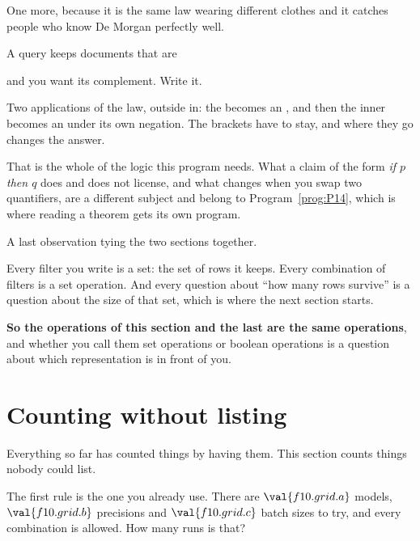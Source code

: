 \begin{fr}
One more, because it is the same law wearing different clothes and it catches
people who know De Morgan perfectly well.

A query keeps documents that are
\begin{center}\end{center}
and you want its complement. Write it.
\nextframe
\end{fr}

\begin{fr}
\begin{ansblock}
\end{ansblock}

Two applications of the law, outside in: the  becomes an ,
and then the inner  becomes an  under its own negation. The
brackets have to stay, and where they go changes the answer.

That is the whole of the logic this program needs. What a claim of the form
\emph{if $p$ then $q$} does and does not license, and what changes when you
swap two quantifiers, are a different subject and belong to
Program~\ref{prog:P14}, which is where reading a theorem gets its own program.
\end{fr}

\begin{fr}
A last observation tying the two sections together.

Every filter you write is a set: the set of rows it keeps. Every combination
of filters is a set operation. And every question about \enquote{how many rows
survive} is a question about the size of that set, which is where the next
section starts.

\textbf{So the operations of this section and the last are the same
operations}, and whether you call them set operations or boolean operations is
a question about which representation is in front of you.
\end{fr}

\section{Counting without listing}
\label{sec:F10-counting}

\begin{fr}
Everything so far has counted things by having them. This section counts
things nobody could list.

The first rule is the one you already use. There are $\val{f10.grid.a}$
models, $\val{f10.grid.b}$ precisions and $\val{f10.grid.c}$ batch sizes to
try, and every combination is allowed. How many runs is that?
\nextframe
\end{fr}

